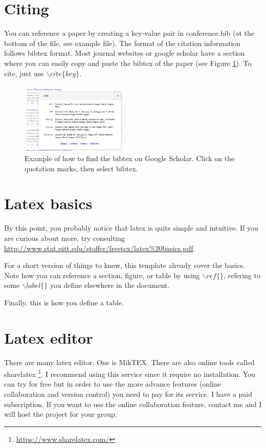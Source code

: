 \documentclass{article}
\begin{document}
\section{Citing}
\label{sec:cite}

You can reference a paper by creating a key-value pair in conference.bib (at the bottom of the file, see example file). The format of the citation information follows bibtex format. Most journal websites or google scholar have a section where you can easily copy and paste the bibtex of the paper (see Figure \ref{fig:bibtex}). To cite, just use $\backslash cite\{key\}$. 

\begin{figure}
  \centering
  \centerline{\includegraphics[width=0.45\textwidth]{bibtex.png}}
  \caption{Example of how to find the bibtex on Google Scholar. Click on the quotation marks, then select bibtex.}
  \label{fig:bibtex}
\end{figure}

\section{Latex basics}
\label{sec:latex}

By this point, you probably notice that latex is quite simple and intuitive. If you are curious about more, try consulting \url{http://www.stat.pitt.edu/stoffer/freetex/latex%20basics.pdf}.

For a short version of things to know, this template already cover the basics. Note how you can reference a section, figure, or table by using $\backslash ref\{\}$, refering to some $\backslash label\{\}$ you define elsewhere in the document.

Finally, this is how you define a table.

\section{Latex editor}

There are many latex editor. One is MikTEX. There are also online tools called sharelatex \footnote{\url{https://www.sharelatex.com/}}. I recommend using this service since it require no installation. You can try for free but in order to use the more advance features (online collaboration and version control) you need to pay for its service. I have a paid subscription. If you want to use the online collaboration feature, contact me and I will host the project for your group.
\end{document}
